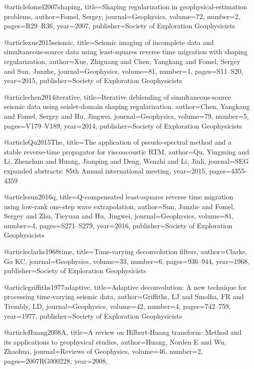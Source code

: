 {@article{fomel2007shaping,
  title={Shaping regularization in geophysical-estimation problems},
  author={Fomel, Sergey},
  journal={Geophysics},
  volume={72},
  number={2},
  pages={R29--R36},
  year={2007},
  publisher={Society of Exploration Geophysicists}
}

@article{xue2015seismic,
  title={Seismic imaging of incomplete data and simultaneous-source data using least-squares reverse time migration with shaping regularization},
  author={Xue, Zhiguang and Chen, Yangkang and Fomel, Sergey and Sun, Junzhe},
  journal={Geophysics},
  volume={81},
  number={1},
  pages={S11--S20},
  year={2015},
  publisher={Society of Exploration Geophysicists}
}

@article{chen2014iterative,
  title={Iterative deblending of simultaneous-source seismic data using seislet-domain shaping regularization},
  author={Chen, Yangkang and Fomel, Sergey and Hu, Jingwei},
  journal={Geophysics},
  volume={79},
  number={5},
  pages={V179--V189},
  year={2014},
  publisher={Society of Exploration Geophysicists}
}

@article{Qu2015The,
  title={The application of pseudo-spectral method and a stable reverse-time propagator for viscoacoustic {RTM}},
  author={Qu, Yingming and Li, Zhenchun and Huang, Jianping and Deng, Wenzhi and Li, Jinli},
  journal={SEG expanded abstracts: 85th Annual international meeting},
  year={2015},
  pages={4355-4359}
}

@article{sun2016q,
  title={Q-compensated least-squares reverse time migration using low-rank one-step wave extrapolation},
  author={Sun, Junzhe and Fomel, Sergey and Zhu, Tieyuan and Hu, Jingwei},
  journal={Geophysics},
  volume={81},
  number={4},
  pages={S271--S279},
  year={2016},
  publisher={Society of Exploration Geophysicists}
}

@article{clarke1968time,
  title={Time-varying deconvolution filters},
  author={Clarke, Go KC},
  journal={Geophysics},
  volume={33},
  number={6},
  pages={936--944},
  year={1968},
  publisher={Society of Exploration Geophysicists}
}

@article{griffiths1977adaptive,
  title={Adaptive deconvolution: A new technique for processing time-varying seismic data},
  author={Griffiths, LJ and Smolka, FR and Trembly, LD},
  journal={Geophysics},
  volume={42},
  number={4},
  pages={742--759},
  year={1977},
  publisher={Society of Exploration Geophysicists}
}

@article{Huang2008A,
  title={A review on {H}ilbert‐{H}uang transform: {M}ethod and its applications to geophysical studies},
  author={Huang, Norden E and Wu, Zhaohua},
  journal={Reviews of Geophysics},
  volume={46},
  number={2},
  pages={2007RG000228},
  year={2008},
}

}
